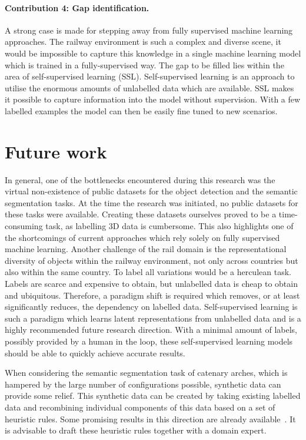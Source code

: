 \paragraph{Contribution 4: Gap identification.}
A strong case is made for stepping away from fully supervised machine learning approaches. The railway environment is such a complex and diverse scene, it would be impossible to capture this knowledge in a single machine learning model which is trained in a fully-supervised way. The gap to be filled lies within the area of self-supervised learning (SSL). Self-supervised learning is an approach to utilise the enormous amounts of unlabelled data which are available. SSL makes it possible to capture information into the model without supervision. With a few labelled examples the model can then be easily fine tuned to new scenarios.

\section{Future work}
In general, one of the bottlenecks encountered during this research was the virtual non-existence of public datasets for the object detection and the semantic segmentation tasks. At the time the research was initiated, no public datasets for these tasks were available. Creating these datasets ourselves proved to be a time-consuming task, as labelling 3D data is cumbersome. This also highlights one of the shortcomings of current approaches which rely solely on fully supervised machine learning. Another challenge of the rail domain is the representational diversity of objects within the railway environment, not only across countries but also within the same country. To label all variations would be a herculean task. Labels are scarce and expensive to obtain, but unlabelled data is cheap to obtain and ubiquitous. Therefore, a paradigm shift is required which removes, or at least significantly reduces, the dependency on labelled data. Self-supervised learning is such a paradigm which learns latent representations from unlabelled data and is a highly recommended future research direction. With a minimal amount of labels, possibly provided by a human in the loop, these self-supervised learning models should be able to quickly achieve accurate results. 

When considering the semantic segmentation task of catenary arches, which is hampered by the large number of configurations possible, synthetic data can provide some relief. This synthetic data can be created by taking existing labelled data and recombining individual components of this data based on a set of heuristic rules. Some promising results in this direction are already available~\cite{Neri22, uggla2021towards, dekker2023semi}. It is advisable to draft these heuristic rules together with a domain expert.

